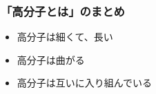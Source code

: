 \documentclass[12pt, dvipdfmx]{beamer}
\begin{document}
\begin{frame}
	\frametitle{「高分子とは」のまとめ}
        \begin{boxnote}
            \vspace{-3mm}
            \begin{itemize}
                \item 高分子は細くて、長い
                \item 高分子は曲がる
                \item 高分子は互いに入り組んでいる
            \end{itemize}
        \end{boxnote}
\end{frame}
\end{document}
